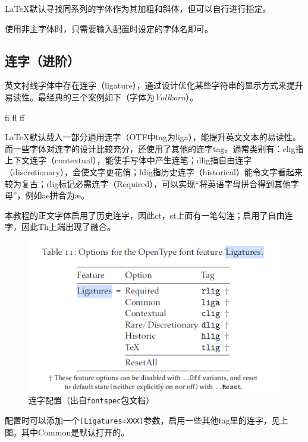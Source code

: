 \documentclass[10pt,openany]{book}
\begin{document}


\LaTeX 默认寻找同系列的字体作为其加粗和斜体，但可以自行进行指定。



使用非主字体时，只需要输入配置时设定的字体名即可。



\subsection{连字（进阶）}

英文衬线字体中存在连字（ligature），通过设计优化某些字符串的显示方式来提升易读性。最经典的三个案例如下（字体为\textit{Vollkorn}）。

\begin{minipage}[c][3\baselineskip]{30\ccwd}
    \centering{}\Huge fi fl ff
\end{minipage}

\LaTeX 默认载入一部分通用连字（OTF中tag为liga），能提升英文文本的易读性。而一些字体对连字的设计比较充分，还使用了其他的连字tag。通常类别有：clig指上下文连字（contextual），能使手写体中产生连笔；dlig指自由连字（discretionary），会使文字更花俏；hlig指历史连字（historical）能令文字看起来较为复古；rlig标记必需连字（Required），可以实现“将英语字母拼合得到其他字母”，例如ae拼合为æ。

本教程的正文字体启用了历史连字，因此ct，st上面有一笔勾连；启用了自由连字，因此Th上端出现了融合。

\begin{figure}[H]
    \centering
    \includegraphics[width=.7\linewidth]{data/ligatures.png}
    \caption{连字配置（出自\texttt{fontspec}包文档）}
\end{figure}

配置时可以添加一个\texttt{[Ligatures=XXX]}参数，启用一些其他tag里的连字，见上图。其中Common是默认打开的。
\end{document}

